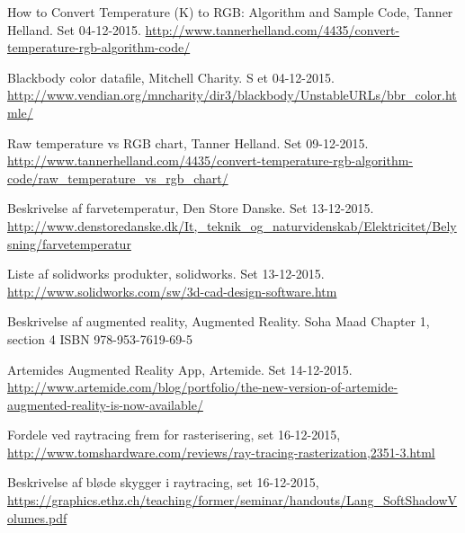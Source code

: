 \begin{thebibliography}{99}
  How to Convert Temperature (K) to RGB: Algorithm and   Sample Code,
  Tanner Helland.
  Set 04-12-2015.
  \url{http://www.tannerhelland.com/4435/convert-temperature-rgb-algorithm-code/}
  
  Blackbody color datafile, 
  Mitchell Charity. S
  et 04-12-2015.
  \url{http://www.vendian.org/mncharity/dir3/blackbody/UnstableURLs/bbr_color.htmle/}
  
  Raw temperature vs RGB chart,
  Tanner Helland. 
  Set 09-12-2015.
  \url{http://www.tannerhelland.com/4435/convert-temperature-rgb-algorithm-code/raw_temperature_vs_rgb_chart/}

  Beskrivelse af farvetemperatur, 
  Den Store Danske. 
  Set 13-12-2015.
  \url{http://www.denstoredanske.dk/It,_teknik_og_naturvidenskab/Elektricitet/Belysning/farvetemperatur}
  
  Liste af solidworks produkter, 
  solidworks. 
  Set 13-12-2015.
  \url{http://www.solidworks.com/sw/3d-cad-design-software.htm}

  Beskrivelse af augmented reality,
  Augmented Reality.
  Soha Maad
  Chapter 1, section 4
  ISBN 978-953-7619-69-5

  Artemides Augmented Reality App, 
  Artemide.
  Set 14-12-2015.
  \url{http://www.artemide.com/blog/portfolio/the-new-version-of-artemide-augmented-reality-is-now-available/}

  Fordele ved raytracing frem for rasterisering, set 16-12-2015,
  \url{http://www.tomshardware.com/reviews/ray-tracing-rasterization,2351-3.html}

  Beskrivelse af bløde skygger i raytracing, set 16-12-2015,
  \url{https://graphics.ethz.ch/teaching/former/seminar/handouts/Lang_SoftShadowVolumes.pdf}




% 

  



\end{thebibliography}
